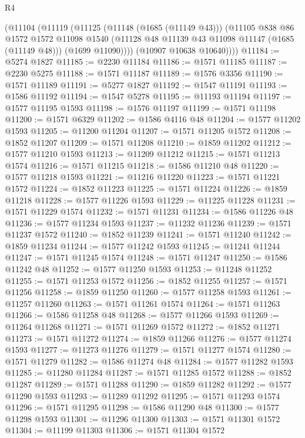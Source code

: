 \begin{lexlean}{R4}
\begin{coremodule}
        (@11104
          (@11119
            (@11125
              (@11148 (@1685 (@11149 @43)))
              (@11105
                @838
                @86
                @1572
                @1572
                @11098
                @1540
                (@11128 @48 @11139 @43 @11098 @11147 (@1685 (@11149 @48)))
                (@1699 @11090))))
          (@10907 @10638 @10640))))
@11184 := @5274 @1827
@11185 := @2230 @11184
@11186 := @1571 @11185
@11187 := @2230 @5275
@11188 := @1571 @11187
@11189 := @1576 @3356
@11190 := @1571 @11189
@11191 := @5277 @1827
@11192 := @1547 @11191
@11193 := @1586 @11192
@11194 := @1547 @5278
@11195 := @11193 @11194
@11197 := @1577 @11195 @1593
@11198 := @1576 @11197
@11199 := @1571 @11198
@11200 := @1571 @6329
@11202 := @1586 @4116 @48
@11204 := @1577 @11202 @1593
@11205 := @11200 @11204
@11207 := @1571 @11205 @1572
@11208 := @1852 @11207
@11209 := @1571 @11208
@11210 := @1859 @11202
@11212 := @1577 @11210 @1593
@11213 := @11209 @11212
@11215 := @1571 @11213 @1574
@11216 := @1571 @11215
@11218 := @1586 @11210 @48
@11220 := @1577 @11218 @1593
@11221 := @11216 @11220
@11223 := @1571 @11221 @1572
@11224 := @1852 @11223
@11225 := @1571 @11224
@11226 := @1859 @11218
@11228 := @1577 @11226 @1593
@11229 := @11225 @11228
@11231 := @1571 @11229 @1574
@11232 := @1571 @11231
@11234 := @1586 @11226 @48
@11236 := @1577 @11234 @1593
@11237 := @11232 @11236
@11239 := @1571 @11237 @1572
@11240 := @1852 @11239
@11241 := @1571 @11240
@11242 := @1859 @11234
@11244 := @1577 @11242 @1593
@11245 := @11241 @11244
@11247 := @1571 @11245 @1574
@11248 := @1571 @11247
@11250 := @1586 @11242 @48
@11252 := @1577 @11250 @1593
@11253 := @11248 @11252
@11255 := @1571 @11253 @1572
@11256 := @1852 @11255
@11257 := @1571 @11256
@11258 := @1859 @11250
@11260 := @1577 @11258 @1593
@11261 := @11257 @11260
@11263 := @1571 @11261 @1574
@11264 := @1571 @11263
@11266 := @1586 @11258 @48
@11268 := @1577 @11266 @1593
@11269 := @11264 @11268
@11271 := @1571 @11269 @1572
@11272 := @1852 @11271
@11273 := @1571 @11272
@11274 := @1859 @11266
@11276 := @1577 @11274 @1593
@11277 := @11273 @11276
@11279 := @1571 @11277 @1574
@11280 := @1571 @11279
@11282 := @1586 @11274 @48
@11284 := @1577 @11282 @1593
@11285 := @11280 @11284
@11287 := @1571 @11285 @1572
@11288 := @1852 @11287
@11289 := @1571 @11288
@11290 := @1859 @11282
@11292 := @1577 @11290 @1593
@11293 := @11289 @11292
@11295 := @1571 @11293 @1574
@11296 := @1571 @11295
@11298 := @1586 @11290 @48
@11300 := @1577 @11298 @1593
@11301 := @11296 @11300
@11303 := @1571 @11301 @1572
@11304 := @11199 @11303
@11306 := @1571 @11304 @1572

\end{coremodule}
\end{lexlean}
